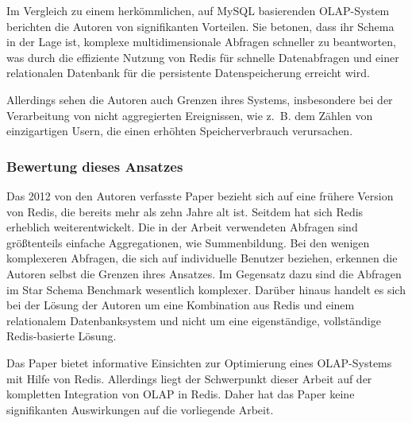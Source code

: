 Im Vergleich zu einem herkömmlichen, auf MySQL basierenden OLAP-System berichten die Autoren von signifikanten Vorteilen. Sie betonen, dass ihr Schema in der Lage ist, komplexe multidimensionale Abfragen schneller zu beantworten, was durch die effiziente Nutzung von Redis für schnelle Datenabfragen und einer relationalen Datenbank für die persistente Datenspeicherung erreicht wird.

Allerdings sehen die Autoren auch Grenzen ihres Systems, insbesondere bei der Verarbeitung von nicht aggregierten Ereignissen, wie z.~B. dem Zählen von einzigartigen Usern, die einen erhöhten Speicherverbrauch verursachen.


\subsubsection{Bewertung dieses Ansatzes}
Das 2012 von den Autoren verfasste Paper bezieht sich auf eine frühere Version von Redis, die bereits mehr als zehn Jahre alt ist.
Seitdem hat sich Redis erheblich weiterentwickelt.
Die in der Arbeit verwendeten Abfragen sind größtenteils einfache Aggregationen, wie Summenbildung.
Bei den wenigen komplexeren Abfragen, die sich auf individuelle Benutzer beziehen, erkennen die Autoren selbst die Grenzen ihres Ansatzes.
Im Gegensatz dazu sind die Abfragen im Star Schema Benchmark wesentlich komplexer.
Darüber hinaus handelt es sich bei der Lösung der Autoren um eine Kombination aus Redis und einem relationalem Datenbanksystem und nicht um eine eigenständige, vollständige Redis-basierte Lösung.

Das Paper bietet informative Einsichten zur Optimierung eines OLAP-Systems mit Hilfe von Redis. Allerdings liegt der Schwerpunkt dieser Arbeit auf der kompletten Integration von OLAP in Redis. Daher hat das Paper keine signifikanten Auswirkungen auf die vorliegende Arbeit.

 